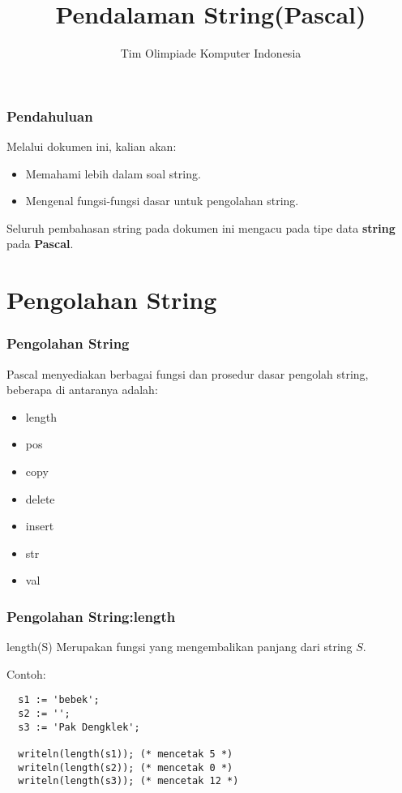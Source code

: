 

\title{Pendalaman String\newline (Pascal)}
\author{Tim Olimpiade Komputer Indonesia}
\date{}



\begin{frame}
\titlepage
\end{frame}

\begin{frame}
\frametitle{Pendahuluan}
Melalui dokumen ini, kalian akan:
\begin{itemize}
  \item Memahami lebih dalam soal string.
  \item Mengenal fungsi-fungsi dasar untuk pengolahan string.
\end{itemize}
\vfill
Seluruh pembahasan string pada dokumen ini mengacu pada tipe data \textbf{string} pada \textbf{Pascal}.
\end{frame}

\section{Pengolahan String}
\frame{\sectionpage}

\begin{frame}
\frametitle{Pengolahan String}
Pascal menyediakan berbagai fungsi dan prosedur dasar pengolah string, beberapa di antaranya adalah:
\begin{itemize}
  \item length
  \item pos
  \item copy
  \item delete
  \item insert
  \item str
  \item val
\end{itemize}
\end{frame}

\begin{frame}[fragile]
\frametitle{Pengolahan String:\newline length}
\begin{block}{length(S)}
Merupakan fungsi yang mengembalikan panjang dari string $S$.
\end{block}

Contoh:
\begin{lstlisting}
  s1 := 'bebek';
  s2 := '';
  s3 := 'Pak Dengklek';

  writeln(length(s1)); (* mencetak 5 *)
  writeln(length(s2)); (* mencetak 0 *)
  writeln(length(s3)); (* mencetak 12 *)
\end{lstlisting}
\end{frame}

